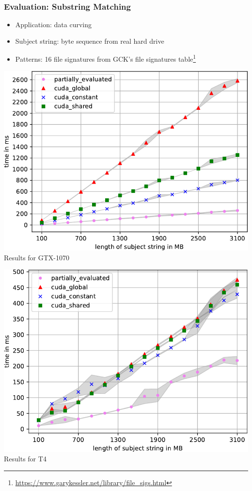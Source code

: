 \documentclass[xcolor=table]{beamer}
\begin{document}
\begin{frame}[fragile] \frametitle{Evaluation: Substring Matching}
  \begin{itemize}
  \item Application: data curving
  \item Subject string: byte sequence from real hard drive
  \item Patterns: 16 file signatures from GCK’s file signatures table\footnote{\url{https://www.garykessler.net/library/file_sigs.html}}
  \end{itemize}
  \begin{center}
  \begin{minipage}[t]{0.48\textwidth}
    \begin{center}
  {\includegraphics[width=\textwidth]{pictures/Substr_1070-crop}}
  \\Results for GTX-1070
\end{center}
\end{minipage}
\begin{minipage}[t]{0.48\textwidth}
  \begin{center}
{\includegraphics[width=\textwidth]{pictures/Substr_T4-crop}}
\\Results for T4
\end{center}
\end{minipage}
\end{center}
\end{frame}
\end{document}
